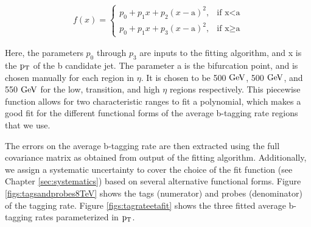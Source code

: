 \begin{eqnarray}
f(x) =
\begin{cases}
p_0+p_1x+p_2(x-\text{a})^2, & \text{if x} < \text{a} \\
p_0+p_1x+p_3(x-\text{a})^2, & \text{if x}\geq\text{a}
\end{cases}
\end{eqnarray}

Here, the parameters $p_0$ through $p_3$ are inputs to the fitting algorithm, and x is the $\mathrm{p_{T}}$ of the b candidate jet.  The parameter a is the bifurcation point, and is chosen manually for each region in $\eta$.
It is chosen to be 500$~\mathrm{GeV}$, 500$~\mathrm{GeV}$, and 550$~\mathrm{GeV}$ for the low, transition, and high $\eta$ regions respectively.
This piecewise function allows for two characteristic ranges to fit a polynomial, which makes a good fit for the different functional forms of the average b-tagging rate regions that we use.

The errors on the average b-tagging rate are then extracted using the full covariance matrix as obtained from output of the fitting 
algorithm.   
Additionally, we assign a systematic uncertainty to cover the choice of the fit function (see Chapter \ref{sec:systematics}) based on several alternative functional forms.
Figure \ref{figs:tagsandprobes8TeV} shows the tags (numerator) and probes (denominator) of the tagging rate.
Figure \ref{figs:tagrateetafit} shows the three fitted average b-tagging rates parameterized in $\mathrm{p_{T}}$.  



